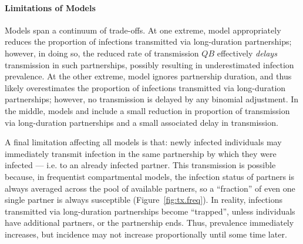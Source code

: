 \paragraph{Limitations of Models }
Models  span a continuum of trade-offs.
At one extreme, model  appropriately reduces the proportion of infections
transmitted via long-duration partnerships;
however, in doing so, the reduced rate of transmission $QB$
effectively \emph{delays} transmission in such partnerships,
possibly resulting in underestimated infection prevalence.
At the other extreme, model  ignores partnership duration,
and thus likely overestimates the proportion of infections
transmitted via long-duration partnerships;
however, no transmission is delayed by any binomial adjustment.
In the middle, models  and  include
a small reduction in proportion of transmission via long-duration partnerships
and a small associated delay in transmission.
\par
A final limitation affecting all models  is that:
newly infected individuals may immediately transmit infection
in the same partnership by which they were infected
--- i.e. to an already infected partner.
This transmission is possible because, in frequentist compartmental models,
the infection status of partners is always averaged across the pool of available partners,
so a ``fraction'' of even one single partner is always susceptible (Figure~\ref{fig:tx.freq}).
In reality, infections transmitted via long-duration partnerships become ``trapped'',
unless individuals have additional partners, or the partnership ends.
Thus, prevalence immediately increases,
but incidence may not increase proportionally until some time later.
